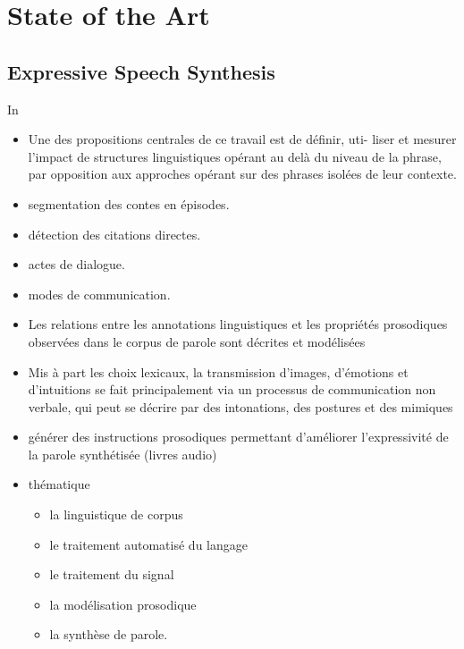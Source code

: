 
\chapter{State of the Art} %

\label{Chapter01} %


\section{Expressive Speech Synthesis}
In \cite{doukhan:tel-01161731}
\begin{itemize}
\item Une des propositions centrales de ce travail est de définir, uti-
liser et mesurer l’impact de structures linguistiques opérant au delà du niveau de la phrase, par
opposition aux approches opérant sur des phrases isolées de leur contexte.
\item  segmentation des contes en épisodes.
\item détection des citations directes.
\item actes de dialogue.
 \item modes de communication. 	
 \item Les relations entre les annotations linguistiques et les propriétés prosodiques observées dans le corpus de parole sont décrites et modélisées
 \item Mis à part les choix lexicaux, la transmission d’images, d’émotions et d’intuitions se fait principalement via un processus de communication non verbale, qui peut se décrire par des intonations, des postures et des mimiques
 
 \item générer des instructions prosodiques permettant d’améliorer l’expressivité de la parole synthétisée (livres audio) 
\item thématique
	\begin{itemize}
		\item la linguistique de corpus
		\item le traitement automatisé du langage \item le traitement du signal	
		\item la modélisation prosodique
		\item la synthèse de parole.
\end{itemize}
\end{itemize}
